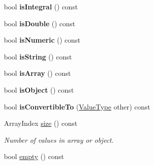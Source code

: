 \begin{DoxyCompactItemize}
\item 
bool {\bfseries is\+Integral} () const\hypertarget{classJson_1_1Value_ab6798954f6e80281cf22708ef45198a7}{}\label{classJson_1_1Value_ab6798954f6e80281cf22708ef45198a7}

\item 
bool {\bfseries is\+Double} () const\hypertarget{classJson_1_1Value_a4a2e2a790e19a1c09fc5dd12d7ad47b5}{}\label{classJson_1_1Value_a4a2e2a790e19a1c09fc5dd12d7ad47b5}

\item 
bool {\bfseries is\+Numeric} () const\hypertarget{classJson_1_1Value_af961a000cd203c895e44c195ab39b866}{}\label{classJson_1_1Value_af961a000cd203c895e44c195ab39b866}

\item 
bool {\bfseries is\+String} () const\hypertarget{classJson_1_1Value_a71e1f82cf1c3eaf969d400dcffb163a6}{}\label{classJson_1_1Value_a71e1f82cf1c3eaf969d400dcffb163a6}

\item 
bool {\bfseries is\+Array} () const\hypertarget{classJson_1_1Value_a1627eb9d6568d6d0252fa8bb711c0a59}{}\label{classJson_1_1Value_a1627eb9d6568d6d0252fa8bb711c0a59}

\item 
bool {\bfseries is\+Object} () const\hypertarget{classJson_1_1Value_a8cf96c0f2a552051fcfc78ffee60e037}{}\label{classJson_1_1Value_a8cf96c0f2a552051fcfc78ffee60e037}

\item 
bool {\bfseries is\+Convertible\+To} (\hyperlink{namespaceJson_a7d654b75c16a57007925868e38212b4e}{Value\+Type} other) const\hypertarget{classJson_1_1Value_af1ee6be27a96a7d12128efdd60deb54d}{}\label{classJson_1_1Value_af1ee6be27a96a7d12128efdd60deb54d}

\item 
Array\+Index \hyperlink{classJson_1_1Value_a0ec2808e1d7efa4e9fad938d6667be44}{size} () const\hypertarget{classJson_1_1Value_a0ec2808e1d7efa4e9fad938d6667be44}{}\label{classJson_1_1Value_a0ec2808e1d7efa4e9fad938d6667be44}

\begin{DoxyCompactList}\small\item\em Number of values in array or object. \end{DoxyCompactList}\item 
bool \hyperlink{classJson_1_1Value_a0519a551e37ee6665d74742b3f96bab3}{empty} () const\hypertarget{classJson_1_1Value_a0519a551e37ee6665d74742b3f96bab3}{}\label{classJson_1_1Value_a0519a551e37ee6665d74742b3f96bab3}


\end{DoxyCompactItemize}
